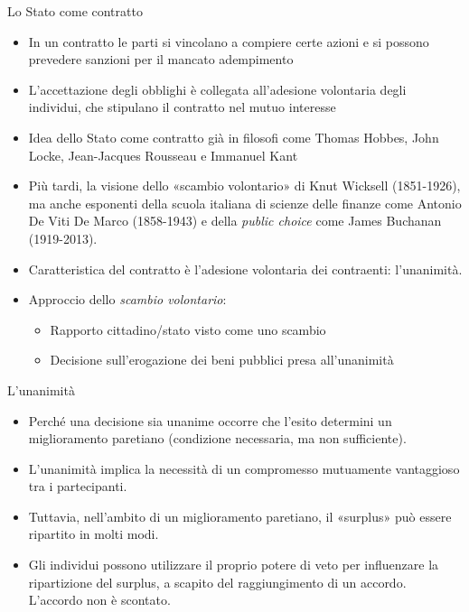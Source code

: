 \documentclass[aspectratio=64,11pt]{beamer}
\begin{document}
\begin{frame}{Lo Stato come contratto}
\begin{itemize}
\item In un contratto le parti si vincolano a compiere certe azioni e si possono
prevedere sanzioni per il mancato adempimento
\item L'accettazione degli obblighi è collegata all'adesione volontaria degli
individui, che stipulano il contratto nel mutuo interesse
\item Idea dello Stato come contratto già in filosofi come Thomas Hobbes, John
Locke, Jean-Jacques Rousseau e Immanuel Kant
\item Più tardi, la visione dello «scambio volontario» di Knut Wicksell
(1851-1926), ma anche esponenti della scuola italiana di scienze delle
finanze come Antonio De Viti De Marco (1858-1943) e della \emph{public choice}
come James Buchanan (1919-2013).
\item Caratteristica del contratto è l'adesione volontaria dei contraenti:
l'unanimità.
\item Approccio dello \emph{scambio volontario}:
\begin{itemize}
\item Rapporto cittadino/stato visto come uno scambio
\item Decisione sull'erogazione dei beni pubblici presa all'\alert{unanimità}
\end{itemize}
\end{itemize}
\end{frame}

\begin{frame}{L'unanimità}
\begin{itemize}
\item Perché una decisione sia unanime occorre che l'esito determini un
miglioramento paretiano (condizione necessaria, ma non sufficiente).
\item L'unanimità implica la necessità di un compromesso mutuamente vantaggioso
tra i partecipanti.
\item Tuttavia, nell'ambito di un miglioramento paretiano, il «surplus» può essere
ripartito in molti modi.
\item Gli individui possono utilizzare il proprio potere di veto per influenzare
la ripartizione del surplus, a scapito del raggiungimento di un
accordo. L'accordo non è scontato.
\end{itemize}
\end{frame}
\end{document}
